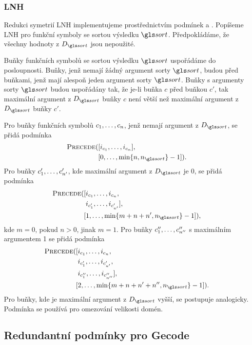 {\subsubsection{LNH}

Redukci symetrií LNH implementujeme prostřednictvím podmínek
\LowerEq{} a \Precede{}. Popíšeme LNH pro funkční symboly
se sortou výsledku $\sort$. Před\-po\-klá\-dáme,
že všechny hodnoty z $D_\sort$ jsou nepoužité.

Buňky funkčních symbolů se sortou výsledku $\sort$
uspořádáme do posloupnosti.
Buňky, jenž nemají žádný argument sorty $\sort$, budou
před buňkami, jenž mají alespoň jeden
argument sorty $\sort$. Buňky s argumenty sorty $\sort$
budou uspořádány tak, že je-li buňka $c$
před buňkou $c'$, tak maximální argument z $D_\sort$ buňky $c$
není větší než maximální argument z $D_\sort$ buňky $c'$.

Pro buňky funkčních symbolů $c_1 , \ldots, c_n$,
jenž nemají argument z $D_\sort$,
se přidá podmínka
\[
\begin{split}
  \Precede([&i_{c_1} \comdots i_{c_n}], \\
           [&0 \comdots \min \{ n, n_\sort \} - 1]).
\end{split}
\]
Pro buňky $c'_1 , \ldots, c'_{n'}$, kde maximální argument z $D_\sort$
je 0, se přidá podmínka
\[
\begin{split}
  \Precede([&i_{c_1} \comdots i_{c_n}, \\
            &i_{c'_1} \comdots i_{c'_{n'}}], \\
           [&1 \comdots \min \{ m + n + n', n_\sort \} - 1]),
\end{split}
\]
kde $m = 0$, pokud $n > 0$, jinak $m = 1$.
Pro buňky $c''_1 , \ldots, c''_{n''}$ s maximálním argumentem
1 se přidá podmínka
\[
\begin{split}
  \Precede([&i_{c_1} \comdots i_{c_n},\\
            &i_{c'_1} \comdots i_{c'_{n'}},\\
            &i_{c''_1} \comdots i_{c''_{n''}}], \\
           [&2 \comdots \min \{ m + n + n' + n'', n_\sort \} - 1]).
\end{split}
\]
Pro buňky, kde je maximální argument z $D_\sort$ vyšší,
se postupuje analogicky. Podmínka \LowerEq{} se používá
pro omezování velikosti domén.

}

\subsection{Redundantní podmínky pro Gecode}

